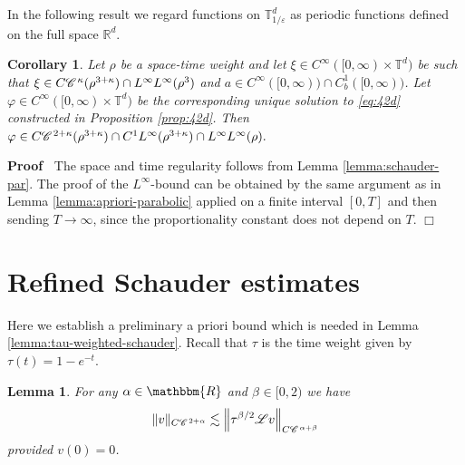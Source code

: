 \documentclass[a4paper,11pt]{article}
\newenvironment{proof}{\noindent\textbf{Proof\ }}{\hspace*{\fill}$\Box$\medskip}
\newtheorem{lemma}[theorem]{Lemma}
\newtheorem{corollary}[theorem]{Corollary}
{\theorembodyfont{\rmfamily}\newtheorem{remark}[theorem]{Remark}}
\numberwithin{equation}{section}
\newcommand{\CC}{\mathscr{C} \hspace{.1em}}
\newcommand{\LL}{\mathscr{L}}
\newcommand{\R}{\mathbb{R}}
\newcommand{\Td}{{\mathbb{T}^{d}}}
\newcommand{\8}{\infty}
\begin{document}
In the following result we regard  functions on $\mathbb{T}^{d}_{1/\varepsilon}$  as periodic functions defined on the full space $\R^{d}$.

\begin{corollary}\label{cor:42d}
Let $\rho$ be a  space-time weight and let $\xi\in C^{\infty}([0,\8)\times\Td)$ be such that $\xi\in C\CC^{\kappa} (\rho^{3 + \kappa})\cap L^{\8}L^{\8}(\rho^{3})$ and $a\in C^{\8}([0,\8))\cap C^{1}_{b}([0,\infty))$. Let $\varphi\in C^{\infty}([0,\8)\times\Td)$  be the corresponding unique solution to \eqref{eq:42d} constructed in Proposition \ref{prop:42d}. Then $\varphi\in C\CC^{2 + \kappa} (\rho^{3 + \kappa})\cap C^{1}L^{\infty}(\rho^{3+\kappa}) \cap L^{\infty}L^{\infty} (\rho).$
\end{corollary}

\begin{proof}
The space and time regularity follows from Lemma \ref{lemma:schauder-par}. The proof of the $L^{\8}$-bound can be obtained by the same argument as in Lemma \ref{lemma:apriori-parabolic} applied on a finite interval $[0,T]$ and then sending $T\to\8$, since the proportionality constant does not depend on $T$.
\end{proof}




\section{Refined Schauder estimates}
\label{s:sch}

Here we establish a preliminary a priori bound which is needed   in Lemma \ref{lemma:tau-weighted-schauder}. Recall that $\tau$ is the time weight given by $\tau (t) = 1 - e^{- t}$.


\begin{lemma}
  \label{lemma:basic-tau-schauder}For any $\alpha \in \mathbbm{R}$ and
  $\beta_{} \in [0, 2)$ we have
  \[ \| v \|_{C \CC^{2 + \alpha}} \lesssim \left\| \tau^{\beta_{} / 2}
     \mathcal{} \LL v \right\|_{C \CC^{\alpha + \beta_{}}} \]
  provided $v (0) = 0$.
\end{lemma}
\end{document}
